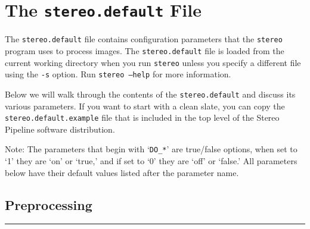 \chapter{The {\tt stereo.default} File}
\label{chapter:stereodefault}

The \texttt{stereo.default} file contains configuration parameters
that the \texttt{stereo} program uses to process images.  The
\texttt{stereo.default} file is loaded from the current working
directory when you run \texttt{stereo} unless you specify a different
file using the \texttt{-s} option.  Run \texttt{stereo --help} for
more information.

Below we will walk through the contents of the \texttt{stereo.default}
and discuss its various parameters.  If you want to start with a clean
slate, you can copy the \texttt{stereo.default.example} file that is
included in the top level of the Stereo Pipeline software distribution.

Note: The parameters that begin with `\texttt{DO\_*}' are true/false
options, when set to `1' they are `on' or `true,' and if set to `0'
they are `off' or `false.'  All parameters below have their default
values listed after the parameter name.


\section{Preprocessing}
\hrule
\bigskip

